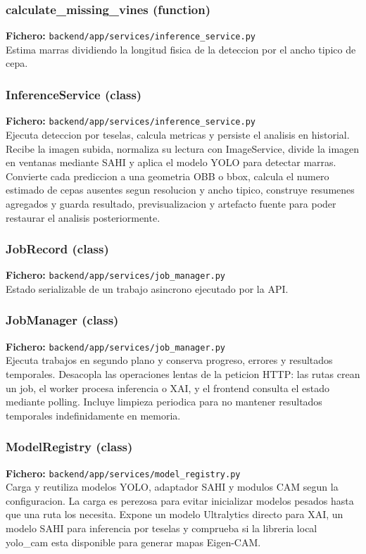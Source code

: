 \subsubsection*{calculate\_missing\_vines (function)}
\noindent\textbf{Fichero:} \texttt{backend/app/services/inference\_service.py}\\
Estima marras dividiendo la longitud fisica de la deteccion por el ancho tipico de cepa.


\subsubsection*{InferenceService (class)}
\noindent\textbf{Fichero:} \texttt{backend/app/services/inference\_service.py}\\
Ejecuta deteccion por teselas, calcula metricas y persiste el analisis en historial. Recibe la imagen subida, normaliza su lectura con ImageService, divide la imagen en ventanas mediante SAHI y aplica el modelo YOLO para detectar marras. Convierte cada prediccion a una geometria OBB o bbox, calcula el numero estimado de cepas ausentes segun resolucion y ancho tipico, construye resumenes agregados y guarda resultado, previsualizacion y artefacto fuente para poder restaurar el analisis posteriormente.


\subsubsection*{JobRecord (class)}
\noindent\textbf{Fichero:} \texttt{backend/app/services/job\_manager.py}\\
Estado serializable de un trabajo asincrono ejecutado por la API.


\subsubsection*{JobManager (class)}
\noindent\textbf{Fichero:} \texttt{backend/app/services/job\_manager.py}\\
Ejecuta trabajos en segundo plano y conserva progreso, errores y resultados temporales. Desacopla las operaciones lentas de la peticion HTTP: las rutas crean un job, el worker procesa inferencia o XAI, y el frontend consulta el estado mediante polling. Incluye limpieza periodica para no mantener resultados temporales indefinidamente en memoria.


\subsubsection*{ModelRegistry (class)}
\noindent\textbf{Fichero:} \texttt{backend/app/services/model\_registry.py}\\
Carga y reutiliza modelos YOLO, adaptador SAHI y modulos CAM segun la configuracion. La carga es perezosa para evitar inicializar modelos pesados hasta que una ruta los necesita. Expone un modelo Ultralytics directo para XAI, un modelo SAHI para inferencia por teselas y comprueba si la libreria local yolo\_cam esta disponible para generar mapas Eigen-CAM.


